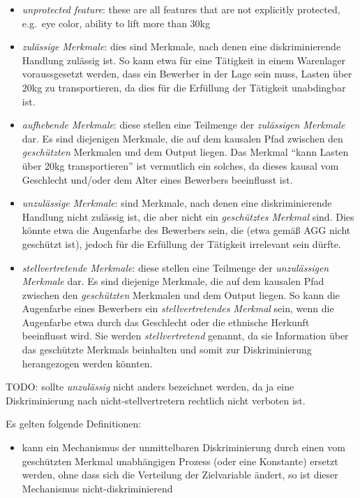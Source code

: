 \documentclass[
]{book}
\providecommand{\tightlist}{%
  \setlength{\itemsep}{0pt}\setlength{\parskip}{0pt}}
\theoremstyle{definition}
\theoremstyle{definition}
\theoremstyle{definition}
\theoremstyle{remark}
\begin{document}
\begin{itemize}
\item
  \emph{unprotected feature}: these are all features that are not explicitly protected, e.g.~eye color, ability to lift more than 30kg
\item
  \emph{zulässige Merkmale}: dies sind Merkmale, nach denen eine diskriminierende Handlung zulässig ist. So kann etwa für eine Tätigkeit in einem Warenlager voraussgesetzt werden, dass ein Bewerber in der Lage sein muss, Lasten über 20kg zu transportieren, da dies für die Erfüllung der Tätigkeit unabdingbar ist.
\item
  \emph{aufhebende Merkmale}: diese stellen eine Teilmenge der \emph{zulässigen Merkmale} dar. Es sind diejenigen Merkmale, die auf dem kausalen Pfad zwischen den \emph{geschützten} Merkmalen und dem Output liegen. Das Merkmal ``kann Lasten über 20kg transportieren'' ist vermutlich ein solches, da dieses kausal vom Geschlecht und/oder dem Alter eines Bewerbers beeinflusst ist.
\item
  \emph{unzulässige Merkmale}: sind Merkmale, nach denen eine diskriminierende Handlung nicht zulässig ist, die aber nicht ein \emph{geschütztes Merkmal} sind. Dies könnte etwa die Augenfarbe des Bewerbers sein, die (etwa gemäß AGG nicht geschützt ist), jedoch für die Erfüllung der Tätigkeit irrelevant sein dürfte.
\item
  \emph{stellvertretende Merkmale}: diese stellen eine Teilmenge der \emph{unzulässigen Merkmale} dar. Es sind diejenige Merkmale, die auf dem kausalen Pfad zwischen den \emph{geschützten} Merkmalen und dem Output liegen. So kann die Augenfarbe eines Bewerbers ein \emph{stellvertretendes Merkmal} sein, wenn die Augenfarbe etwa durch das Geschlecht oder die ethnische Herkunft beeinflusst wird. Sie werden \emph{stellvertretend} genannt, da sie Information über das geschützte Merkmals beinhalten und somit zur Diskriminierung herangezogen werden könnten.
\end{itemize}

TODO: sollte \emph{unzulässig} nicht anders bezeichnet werden, da ja eine Diskriminierung nach nicht-stellvertretern rechtlich nicht verboten ist.

Es gelten folgende Definitionen:

\begin{itemize}
\tightlist
\item
  kann ein Mechanismus der unmittelbaren Diskriminierung durch einen vom geschützten Merkmal unabhängigen Prozess (oder eine Konstante) ersetzt werden, ohne dass sich die Verteilung der Zielvariable ändert, so ist dieser Mechanismus nicht-diskriminierend
\end{itemize}
\end{document}
